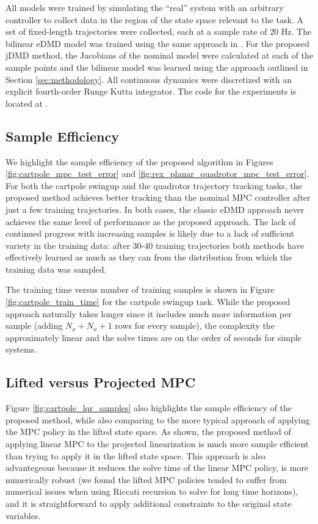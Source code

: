 \documentclass{article}
\begin{document}
All models were trained by simulating the ``real'' system with an arbitrary controller to 
collect data in the region of the state space relevant to the task. A set of fixed-length 
trajectories were collected, each at a sample rate of 20 Hz. The bilinear eDMD model was
trained using the same approach in \cite{Folkestad2021}. For the proposed jDMD method, the
Jacobians of the nominal model were calculated at each of the sample points and the bilinear
model was learned using the approach outlined in Section \ref{sec:methodology}.
All continuous dynamics were discretized with an explicit fourth-order Runge Kutta 
integrator. The code for the experiments is located at 
.

\subsection{Sample Efficiency}

We highlight the sample efficiency of the proposed algorithm in Figures 
\ref{fig:cartpole_mpc_test_error} and \ref{fig:rex_planar_quadrotor_mpc_test_error}. For
both the cartpole swingup and the quadrotor trajectory tracking tasks, the proposed method
achieves better tracking than the nominal MPC controller after just a few training
trajectories. In both cases, the classic eDMD approach never achieves the same level of
performance as the proposed approach. The lack of continued progress with increasing samples
is likely due to a lack of sufficient variety in the training data: after 30-40 training
trajectories both methods have effectively learned as much as they can from the distribution
from which the training data was sampled.

The training time versus number of training samples is shown in Figure 
\ref{fig:cartpole_train_time} for the cartpole swingup task. While the proposed approach 
naturally takes longer since it includes much more information per sample (adding 
$N_x + N_u + 1$ rows for every sample), the complexity the approximately linear and the 
solve times are on the order of seconds for simple systems.

\subsection{Lifted versus Projected MPC}
Figure \ref{fig:cartpole_lqr_samples} also highlights the sample efficiency of the proposed 
method, while also comparing to the more typical approach of applying the MPC policy in the 
lifted state space. As shown, the proposed method of applying linear MPC to the projected 
linearization is much more sample efficient than trying to apply it in the lifted state 
space. This approach is also advantegeous because it reduces the solve time of the linear 
MPC policy, is more numerically robust (we found the lifted MPC policies tended to suffer 
from numerical issues when using Riccati recursion to solve for long time horizons), and 
it is straightforward to apply additional constraints to the original state variables.
\end{document}
